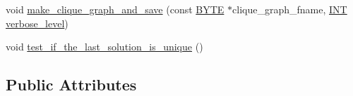 \begin{DoxyCompactItemize}
\item 
void \mbox{\hyperlink{classdiophant_aaab296e7a22b31dff0a5b06fdaff9002}{make\+\_\+clique\+\_\+graph\+\_\+and\+\_\+save}} (const \mbox{\hyperlink{galois_8h_ab6cc7b4aeb6ea31aba2b3fbfc83ff5e6}{B\+Y\+TE}} $\ast$clique\+\_\+graph\+\_\+fname, \mbox{\hyperlink{galois_8h_a09fddde158a3a20bd2dcadb609de11dc}{I\+NT}} \mbox{\hyperlink{simeon_8_c_a818073fbcc2f439e7c56952f67386122}{verbose\+\_\+level}})
\item 
void \mbox{\hyperlink{classdiophant_a78f213245d5ee46f6e3fdd52f149cb48}{test\+\_\+if\+\_\+the\+\_\+last\+\_\+solution\+\_\+is\+\_\+unique}} ()
\end{DoxyCompactItemize}
\subsection*{Public Attributes}
